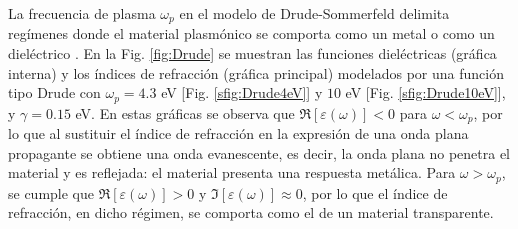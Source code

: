 La frecuencia de plasma $\omega_p$ en el modelo de Drude-Sommerfeld delimita regímenes donde el material plasmónico se comporta como un metal o como un dieléctrico \cite{trugler2011properties}.   En la Fig.  \ref{fig:Drude} se muestran las funciones dieléctricas (gráfica interna) y los índices de refracción  (gráfica principal) modelados por una función tipo Drude con $\omega_p=4. 3$ eV [Fig.  \ref{sfig:Drude4eV}] y $10$ eV [Fig.  \ref{sfig:Drude10eV}], y $\gamma=0. 15$ eV.  En estas gráficas se observa que $\Re[\varepsilon(\omega)]<0$ para $\omega<\omega_p$, por lo que al sustituir el índice de refracción en la expresión de una onda plana propagante se obtiene una onda evanescente, es decir, la onda plana no penetra el material y es reflejada: el material presenta una respuesta metálica.  Para $\omega>\omega_p$, se cumple que $\Re[\varepsilon(\omega)]>0$ y $\Im[\varepsilon(\omega)]\approx 0$, por lo que el índice de refracción, en dicho régimen, se comporta como el de un  material transparente. 

